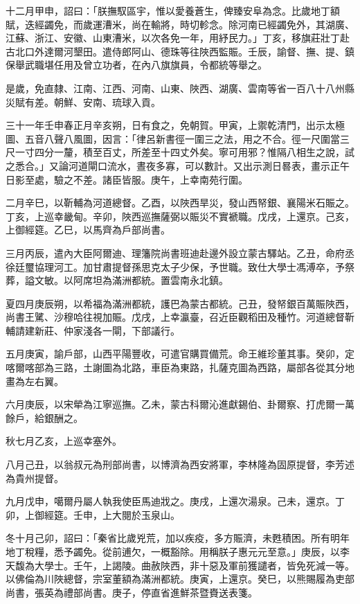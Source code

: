 \begin{pinyinscope}
十二月甲申，詔曰：「朕撫馭區宇，惟以愛養蒼生，俾臻安阜為念。比歲地丁額賦，迭經蠲免，而歲運漕米，尚在輸將，時切軫念。除河南已經蠲免外，其湖廣、江蘇、浙江、安徽、山東漕米，以次各免一年，用紓民力。」丁亥，移旗莊壯丁赴古北口外達爾河墾田。遣侍郎阿山、德珠等往陜西監賑。壬辰，諭督、撫、提、鎮保舉武職堪任用及曾立功者，在內八旗旗員，令都統等舉之。

是歲，免直隸、江南、江西、河南、山東、陜西、湖廣、雲南等省一百八十八州縣災賦有差。朝鮮、安南、琉球入貢。

三十一年壬申春正月辛亥朔，日有食之，免朝賀。甲寅，上禦乾清門，出示太極圖、五音八聲八風圖，因言：「律呂新書徑一圍三之法，用之不合。徑一尺圍當三尺一寸四分一釐，積至百丈，所差至十四丈外矣。寧可用邪？惟隔八相生之說，試之悉合。」又論河道閘口流水，晝夜多寡，可以數計。又出示測日晷表，畫示正午日影至處，驗之不差。諸臣皆服。庚午，上幸南苑行圍。

二月辛巳，以靳輔為河道總督。乙酉，以陜西旱災，發山西帑銀、襄陽米石賑之。丁亥，上巡幸畿甸。辛卯，陜西巡撫薩弼以賑災不實褫職。戊戌，上還京。己亥，上御經筵。乙巳，以馬齊為戶部尚書。

三月丙辰，遣內大臣阿爾迪、理籓院尚書班迪赴邊外設立蒙古驛站。乙丑，命府丞徐廷璽協理河工。加甘肅提督孫思克太子少保，予世職。致仕大學士馮溥卒，予祭葬，謚文敏。以阿席坦為滿洲都統。置雲南永北鎮。

夏四月庚辰朔，以希福為滿洲都統，護巴為蒙古都統。己丑，發帑銀百萬賑陜西，尚書王騭、沙穆哈往視加賑。戊戌，上幸瀛臺，召近臣觀稻田及種竹。河道總督靳輔請建新莊、仲家淺各一閘，下部議行。

五月庚寅，諭戶部，山西平陽豐收，可遣官購買備荒。命王維珍董其事。癸卯，定喀爾喀部為三路，土謝圖為北路，車臣為東路，扎薩克圖為西路，屬部各從其分地畫為左右翼。

六月庚辰，以宋犖為江寧巡撫。乙未，蒙古科爾沁進獻錫伯、卦爾察、打虎爾一萬餘戶，給銀酬之。

秋七月乙亥，上巡幸塞外。

八月己丑，以翁叔元為刑部尚書，以博濟為西安將軍，李林隆為固原提督，李芳述為貴州提督。

九月戊申，噶爾丹屬人執我使臣馬迪戕之。庚戌，上還次湯泉。己未，還京。丁卯，上御經筵。壬申，上大閱於玉泉山。

冬十月己卯，詔曰：「秦省比歲兇荒，加以疾疫，多方賑濟，未甦積困。所有明年地丁稅糧，悉予蠲免。從前逋欠，一概豁除。用稱朕子惠元元至意。」庚辰，以李天馥為大學士。壬午，上謁陵。曲赦陜西，非十惡及軍前獲譴者，皆免死減一等。以佛倫為川陜總督，宗室董額為滿洲都統。庚寅，上還京。癸巳，以熊賜履為吏部尚書，張英為禮部尚書。庚子，停直省進鮮茶暨賚送表箋。


\end{pinyinscope}
